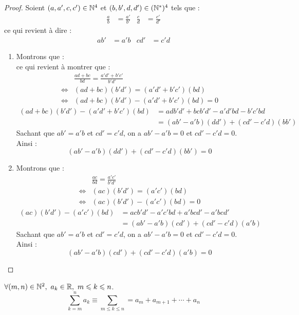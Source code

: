 \begin{proof}
	Soient $(a, a', c, c') \in \mathbb{N}^4$ et $(b, b', d, d') \in (\mathbb{N}^*)^4$ tels que :
	\begin{align*}
		\frac{a}{b} &= \frac{a'}{b'} & \frac{c}{d} &= \frac{c'}{d'}
	\end{align*}
	ce qui revient à dire :
	\begin{align*}
		ab' &= a'b & cd' &= c'd
	\end{align*}
	\begin{enumerate}
		\item Montrons que :
		\[  \]
		ce qui revient à montrer que :
		\begin{align*}
			&\frac{ad + bc}{bd} = \frac{a'd' + b'c'}{b'd'} \\
			\iff &(ad + bc)(b'd') = (a'd' + b'c')(bd)
			\\
			\iff &(ad + bc)(b'd') - (a'd' + b'c')(bd) = 0
		\end{align*}
		\begin{align*}
			(ad + bc)(b'd') - (a'd' + b'c')(bd) &= adb'd' + bcb'd' - a'd'bd - b'c'bd \\
			&= (ab' - a'b)(dd') + (cd' - c'd)(bb')
		\end{align*}
		Sachant que $ab' = a'b$ et $cd' = c'd$, on a $ab' - a'b = 0$ et $cd' - c'd = 0$.
		\\
		Ainsi :
		\[ (ab' - a'b)(dd') + (cd' - c'd)(bb') = 0 \]
		\item Montrons que :
		\begin{align*}
			&\frac{ac}{bd} = \frac{a'c'}{b'd'} \\
			\iff &(ac)(b'd') = (a'c')(bd) \\
			\iff &(ac)(b'd') - (a'c')(bd) = 0
		\end{align*}
		\begin{align*}
			(ac)(b'd') - (a'c')(bd) &= acb'd' - a'c'bd + a'bcd' - a'bcd' \\
			&= (ab' - a'b)(cd') + (cd' - c'd)(a'b) 
		\end{align*}
		Sachant que $ab' = a'b$ et $cd' = c'd$, on a $ab' - a'b = 0$ et $cd' - c'd = 0$.
		\\
		Ainsi :
		\[ (ab' - a'b)(cd') + (cd' - c'd)(a'b) = 0 \]
	\end{enumerate}
\end{proof}

\begin{definition}[Somme]
    $\forall (m, n) \in \mathbb{N}^2,\ a_k \in \mathbb{R},\ m \leqslant k \leqslant n$.
    \[ \sum_{k = m}^n a_k \equiv \sum_{m \leq k \leq n} = a_m + a_{m + 1} + \cdots + a_n \]
\end{definition}

